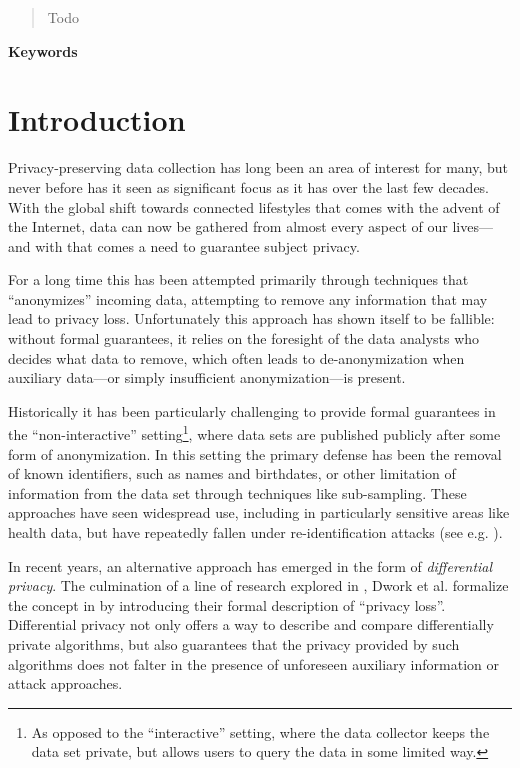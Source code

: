 \documentclass[12pt]{article}
\newcommand{\todo}[1]{{\color{red}#1}}
\begin{document}


\renewcommand{\abstractname}{Abstract}
\begin{abstract}
\todo{Todo}
\end{abstract}

\begin{center} \bf Keywords \end{center}

\thispagestyle{empty}
\tableofcontents
\newpage

\section{Introduction}

Privacy-preserving data collection has long been an area of interest for many, but never before has it seen as significant focus as it has over the last few decades. With the global shift towards connected lifestyles that comes with the advent of the Internet, data can now be gathered from almost every aspect of our lives---and with that comes a need to guarantee subject privacy.

For a long time this has been attempted primarily through techniques that ``anonymizes'' incoming data, attempting to remove any information that may lead to privacy loss. Unfortunately this approach has shown itself to be fallible: without formal guarantees, it relies on the foresight of the data analysts who decides what data to remove, which often leads to de-anonymization when auxiliary data---or simply insufficient anonymization---is present.

\bigskip

Historically it has been particularly challenging to provide formal guarantees in the ``non-interactive'' setting\footnote{As opposed to the ``interactive'' setting, where the data collector keeps the data set private, but allows users to query the data in some limited way.}, where data sets are published publicly after some form of anonymization. In this setting the primary defense has been the removal of known identifiers, such as names and birthdates, or other limitation of information from the data set through techniques like sub-sampling. These approaches have seen widespread use, including in particularly sensitive areas like health data, but have repeatedly fallen under re-identification attacks (see e.g. \cite{reidentification2011}).

In recent years, an alternative approach has emerged in the form of \emph{differential privacy}. The culmination of a line of research explored in \cite{precursor_2003,precursor_2004,precusor_2005}, Dwork et al. formalize the concept in \cite{dworketal2006} by introducing their formal description of ``privacy loss''. Differential privacy not only offers a way to describe and compare differentially private algorithms, but also guarantees that the privacy provided by such algorithms does not falter in the presence of unforeseen auxiliary information or attack approaches.
\end{document}
